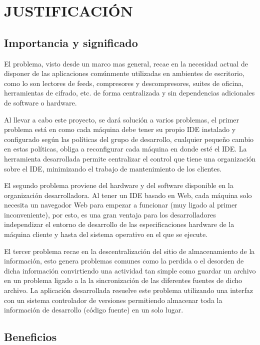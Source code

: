 \section{JUSTIFICACIÓN}


\subsection{Importancia y significado}

El problema, visto desde un marco mas general, recae en la necesidad actual de disponer de las aplicaciones comúnmente utilizadas en ambientes de escritorio, como lo son lectores de feeds, compresores y descompresores, suites de oficina, herramientas de cifrado, etc. de forma centralizada y sin dependencias adicionales de software o hardware.

Al llevar a cabo este proyecto, se dará solución a varios problemas, el primer problema está en como cada máquina debe tener su propio IDE instalado y configurado según las políticas del grupo de desarrollo, cualquier pequeño cambio en estas políticas, obliga a reconfigurar cada máquina en donde esté el IDE. La herramienta desarrollada permite centralizar el control que tiene una organización sobre el IDE, minimizando el trabajo de mantenimiento de los clientes.

El segundo problema proviene del hardware y del software disponible en la organización desarrolladora. Al tener un IDE basado en Web, cada máquina solo necesita un navegador Web para empezar a funcionar (muy ligado al primer inconveniente), por esto, es una gran ventaja para los desarrolladores independizar el entorno de desarrollo de las especificaciones hardware de la máquina cliente y hasta del sistema operativo en el que se ejecute.

El tercer problema recae en la descentralización del sitio de almacenamiento de la información, esto genera problemas comunes como la perdida o el desorden de dicha información convirtiendo una actividad tan simple como guardar un archivo en un problema ligado a la la sincronización de las diferentes fuentes de dicho archivo. La aplicación desarrollada resuelve este problema utilizando una interfaz con un sistema controlador de versiones permitiendo almacenar toda la información de desarrollo (código fuente) en un solo lugar.


\subsection{Beneficios}

